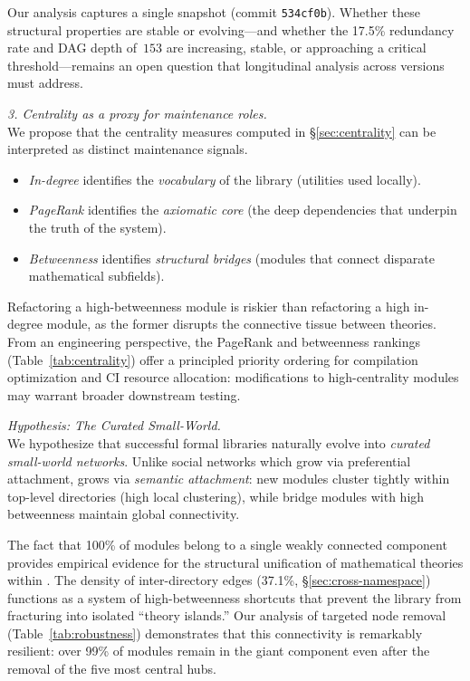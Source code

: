 Our analysis captures a single snapshot (commit \texttt{534cf0b}). Whether these structural properties are stable or evolving---and whether the 17.5\% redundancy rate and DAG depth of~$153$ are increasing, stable, or approaching a critical threshold---remains an open question that longitudinal analysis across  versions must address.

\medskip
\noindent \textit{3. Centrality as a proxy for maintenance roles.} \\
We propose that the centrality measures computed in \S\ref{sec:centrality} can be interpreted as distinct maintenance signals.
\begin{itemize}
    \item \textit{In-degree} identifies the \textit{vocabulary} of the library (utilities used locally).
    \item \textit{PageRank} identifies the \textit{axiomatic core} (the deep dependencies that underpin the truth of the system).
    \item \textit{Betweenness} identifies \textit{structural bridges} (modules that connect disparate mathematical subfields).
\end{itemize}
Refactoring a high-betweenness module is riskier than refactoring a high in-degree module, as the former disrupts the connective tissue between theories. From an engineering perspective, the PageRank and betweenness rankings (Table~\ref{tab:centrality}) offer a principled priority ordering for compilation optimization and CI resource allocation: modifications to high-centrality modules may warrant broader downstream testing.

\medskip
\noindent \textit{Hypothesis: The Curated Small-World.} \\
We hypothesize that successful formal libraries naturally evolve into \textit{curated small-world networks}. Unlike social networks which grow via preferential attachment,  grows via \textit{semantic attachment}: new modules cluster tightly within top-level directories (high local clustering), while bridge modules with high betweenness maintain global connectivity.

The fact that 100\% of modules belong to a single weakly connected component provides empirical evidence for the structural unification of mathematical theories within . The density of inter-directory edges (37.1\%, \S\ref{sec:cross-namespace}) functions as a system of high-betweenness shortcuts that prevent the library from fracturing into isolated ``theory islands.'' Our analysis of targeted node removal (Table~\ref{tab:robustness}) demonstrates that this connectivity is remarkably resilient: over 99\% of modules remain in the giant component even after the removal of the five most central hubs.

